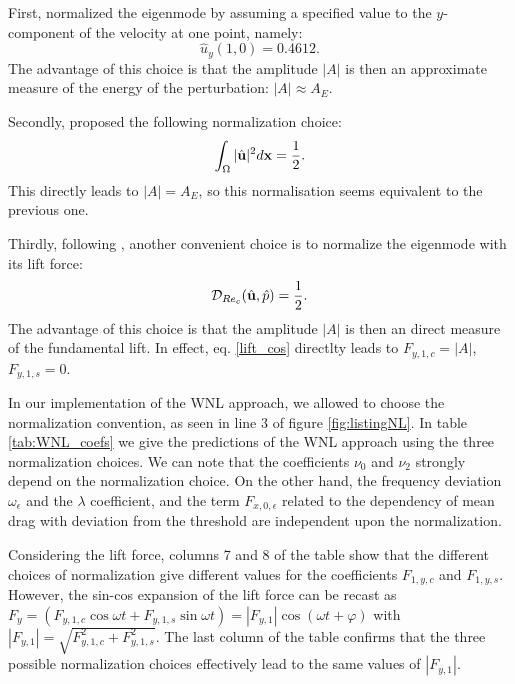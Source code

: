 \documentclass[twocolumn,10pt]{asme2ej}
\newcommand{\be}[1]{ \begin{equation} \label{#1}}
\newcommand{\ee}{\end{equation}}
\begin{document}
First, \cite{SippLebedev} normalized the eigenmode by assuming a specified value to the $y$-component of the velocity at one point, namely:
\be{normsipp}
\hat{u}_y(1,0) = 0.4612.
\ee
The advantage of this choice is that the amplitude $|A|$ is then an approximate measure of the energy of the perturbation: 
$|A| \approx A_E$. %

Secondly, \cite{FDR2016} proposed the following normalization choice:
\be{normFDR}
\int_\Omega |\hat{\bf u}|^2 d {\bf x}  = \frac{1}{2}.
\ee
This directly leads to $|A| = A_E$, so this normalisation seems equivalent to the previous one.

Thirdly, following \cite{Fabre2012}, another convenient choice is to normalize the eigenmode with its lift 
force: 
\be{normfabre}
{{\cal D}_{Re_c}(\hat{\bf u},\hat{p}) }=\frac{1}{2}.
\ee
The advantage of this choice is that the amplitude $|A|$ is then an direct measure of the fundamental lift.
In effect, eq. \ref{lift_cos} directlty leads to $F_{y,1,c} = |A|$, $F_{y,1,s} = 0$. 


In our implementation of the WNL approach, we allowed to choose the normalization convention, as seen in line 3 of figure \ref{fig:listingNL}.
In table \ref{tab:WNL_coefs} we give the predictions of the WNL approach using the three normalization choices.
We can note that the coefficients $\nu_0$ and $\nu_2$ strongly depend on the normalization choice. On the other hand, the frequency deviation $\omega_\epsilon$ and the $\lambda$ coefficient, and the term $F_{x,0,\epsilon}$ related to the dependency of mean drag with deviation from the threshold are independent upon the normalization.

Considering the lift force, columns 7 and 8 of the table show that the different choices of normalization give different values for the coefficients $F_{1,y,c}$ and $F_{1,y,s}$. %
However,  the sin-cos expansion of the lift force can be recast as 
$F_y =  (F_{y,1,c} \cos \omega t + F_{y,1,s} \sin \omega t ) =  |F_{y,1}|  \cos (\omega t + \varphi)$ 
with $ |F_{y,1}| =  \sqrt{F_{y,1,c}^2 + F_{y,1,s}^2}$. The last column of the table confirms that the three possible normalization choices effectively lead to the same values of $|F_{y,1}|$.
\end{document}

